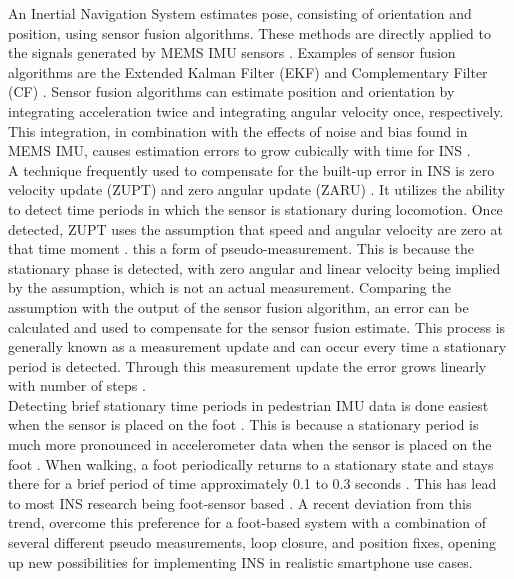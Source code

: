 An Inertial Navigation System estimates pose, consisting of orientation and position, using sensor fusion algorithms. These methods are directly applied to the signals generated by MEMS IMU sensors \cite{Wu2019}. Examples of sensor fusion algorithms are the Extended Kalman Filter (EKF) and Complementary Filter (CF) \cite{Kok2017}. Sensor fusion algorithms can estimate position and orientation by integrating acceleration twice and integrating angular velocity once, respectively. This integration, in combination with the effects of noise and bias found in MEMS IMU, causes estimation errors to grow cubically with time for INS \cite{Harle2013}. \\
\newline
A technique frequently used to compensate for the built-up error in INS is zero velocity update (ZUPT) and zero angular update (ZARU) \cite{Harle2013}. It utilizes the ability to detect time periods in which the sensor is stationary during locomotion. Once detected, ZUPT uses the assumption that speed and angular velocity are zero at that time moment \cite{Wu2019,Harle2013}. this a form of pseudo-measurement. This is because the stationary phase is detected, with zero angular and linear velocity being implied by the assumption, which is not an actual measurement. Comparing the assumption with the output of the sensor fusion algorithm, an error can be calculated and used to compensate for the sensor fusion estimate. This process is generally known as a measurement update and can occur every time a stationary period is detected.  Through this measurement update the error grows linearly with number of steps \cite{foxlin2005pedestrian}.\\
\newline
Detecting brief stationary time periods in pedestrian IMU data is done easiest when the sensor is placed on the foot \cite{Diez2018,Davidson2017}. This is because a stationary period is much more pronounced in accelerometer data when the sensor is placed on the foot \cite{Yu2019,Wu2019}.  When walking, a foot periodically returns to a stationary state and stays there for a brief period of time approximately 0.1 to 0.3 seconds \cite{Ren2016a}. This has lead to most \ac{INS} research being foot-sensor based \cite{Diez2018,Wu2019}. A recent deviation from this trend, \citet{Solin2018a} overcome this preference for a foot-based system with a combination of several different pseudo measurements, loop closure, and position fixes, opening up new possibilities for implementing INS in realistic smartphone use cases.\\
